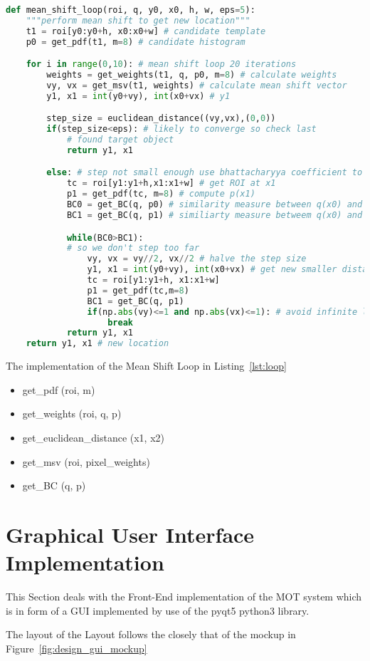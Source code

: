 \begin{lstlisting}[language=Python, caption={Mean Shift Loop}, captionpos=b, label={lst:loop}]
def mean_shift_loop(roi, q, y0, x0, h, w, eps=5):
    """perform mean shift to get new location"""
    t1 = roi[y0:y0+h, x0:x0+w] # candidate template
    p0 = get_pdf(t1, m=8) # candidate histogram

    for i in range(0,10): # mean shift loop 20 iterations
        weights = get_weights(t1, q, p0, m=8) # calculate weights
        vy, vx = get_msv(t1, weights) # calculate mean shift vector
        y1, x1 = int(y0+vy), int(x0+vx) # y1

        step_size = euclidean_distance((vy,vx),(0,0))
        if(step_size<eps): # likely to converge so check last
            # found target object
            return y1, x1

        else: # step not small enough use bhattacharyya coefficient to refine step
            tc = roi[y1:y1+h,x1:x1+w] # get ROI at x1
            p1 = get_pdf(tc, m=8) # compute p(x1)
            BC0 = get_BC(q, p0) # similarity measure between q(x0) and p(x0) 
            BC1 = get_BC(q, p1) # similiarty measure betweem q(x0) and p(x1)

            while(BC0>BC1):
            # so we don't step too far
                vy, vx = vy//2, vx//2 # halve the step size
                y1, x1 = int(y0+vy), int(x0+vx) # get new smaller distance 
                tc = roi[y1:y1+h, x1:x1+w]
                p1 = get_pdf(tc,m=8)
                BC1 = get_BC(q, p1)
                if(np.abs(vy)<=1 and np.abs(vx)<=1): # avoid infinite loop
                    break
            return y1, x1
    return y1, x1 # new location
\end{lstlisting}

The implementation of the Mean Shift Loop in Listing~\ref{lst:loop} 
\begin{itemize}
    \item get\_pdf (roi, m)
    \item get\_weights (roi, q, p)
    \item get\_euclidean\_distance (x1, x2)
    \item get\_msv (roi, pixel\_weights)
    \item get\_BC (q, p)
\end{itemize}


\section{Graphical User Interface Implementation}
This Section deals with the Front-End implementation of the MOT system which is
in form of a GUI implemented by use of the pyqt5 python3 library.

The layout of the Layout follows the closely that of the mockup in
Figure~\ref{fig:design_gui_mockup}



